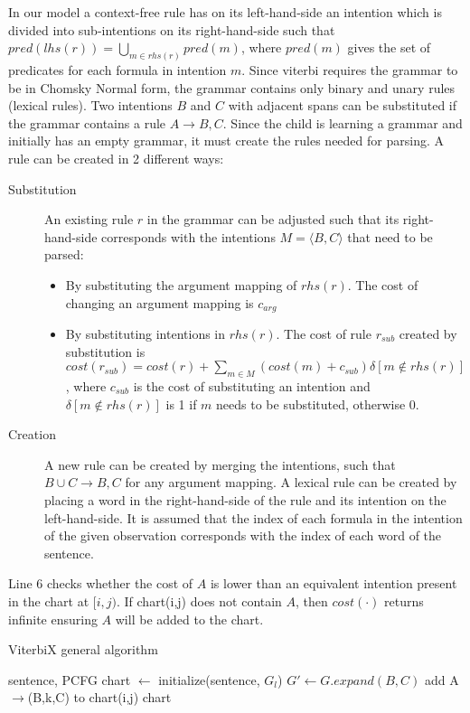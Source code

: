 \documentclass[a4paper]{article}
\begin{document}
In our model a context-free rule has on its left-hand-side an intention which is divided into sub-intentions on its right-hand-side such that $pred(lhs(r)) =  \bigcup_{m \in rhs(r)} pred(m)$, where $pred(m)$ gives the set of predicates for each formula in intention $m$. Since viterbi requires the grammar to be in Chomsky Normal form, the grammar contains only binary and unary rules (lexical rules).  Two intentions $B$ and $C$ with adjacent spans can be substituted if the grammar contains a rule $A \rightarrow B, C$. Since the child is learning a grammar and initially has an empty grammar, it must create the rules needed for parsing. A rule can be created in 2 different ways:
\begin{description}
\item[Substitution] An existing rule $r$ in the grammar can be adjusted such that its right-hand-side corresponds with the intentions $M = \langle B, C \rangle$ that need to be parsed:
  \begin{itemize}
  \item By substituting the argument mapping of $rhs(r)$. The cost of changing an argument mapping is $c_{arg}$
  \item By substituting intentions in $rhs(r)$. The cost of rule $r_{sub}$ created by substitution is $cost(r_{sub}) = cost(r) + \sum_{m \in M} (cost(m) + c_{sub}) \delta[m \notin rhs(r) ]$, where $c_{sub}$ is the cost of substituting an intention and $\delta[m \notin rhs(r) ]$ is 1 if $m$ needs to be substituted, otherwise 0.
  \end{itemize}
\item[Creation] A new rule can be created by merging the intentions, such that $B\cup C \rightarrow B, C$ for any argument mapping. A lexical rule can be created by placing a word in the right-hand-side of the rule and its intention on the left-hand-side. It is assumed that the index of each formula in the intention of the given observation corresponds with the index of each word of the sentence.
\end{description}

Line 6 checks whether the cost of $A$ is lower than an equivalent intention present in the chart at $[i,j)$. If chart(i,j) does not contain $A$, then $cost(\cdot)$ returns infinite ensuring $A$ will be added to the chart.

\begin{algorithm}
\caption{ViterbiX general algorithm}
\begin{algorithmic}[1]
\REQUIRE sentence, PCFG
\STATE chart $\leftarrow$ initialize(sentence, $G_l$)
        \STATE $G' \leftarrow G.expand(B, C)$
                \STATE add A$\rightarrow$(B,k,C) to chart(i,j)
            \ENDIF
        \ENDFOR
    \ENDFOR
\ENDFOR
\RETURN chart
\end{algorithmic}
\label{alg:viterbi}
\end{algorithm}
\end{document}
